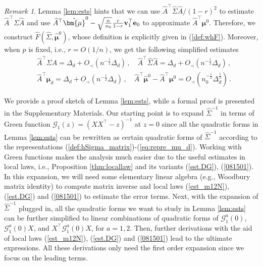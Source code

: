 \documentclass[12pt]{article}
\numberwithin{equation}{section}
\theoremstyle{remark}
\newtheorem{myRem}{Remark}
\newcommand{\1}{{\rm 1}\kern-0.24em{\rm I}}
\begin{document}
\begin{myRem} \label{rmk:ests}
Lemma \ref{lem:ests} hints that we can use $\widehat{A} ^{\top} \widehat\Sigma \widehat{A} /(1-r)^2$ to estimate $\widehat{A} ^{\top}  \Sigma \widehat{A} $ and use $\widehat{A} ^{\top} \hat{\bm{\mu}}^0 - \sqrt{\frac{n}{n_0}} \frac{r}{1-r} {\bf v}_1^{\top} {\bf e}_0$ to approximate $\widehat{A} ^{\top} {\bm{\mu}}^0$. Therefore,  we construct $\widehat{F}(\widehat\Sigma, \hat{\bm{\mu}}^0)$, whose definition is explicitly given in (\ref{def:whF}). Moreover, when $p$ is fixed, i.e., $r=O(1/n)$, we get the following simplified estimates
\begin{align}
&\widehat{A} ^{\top} \Sigma \widehat{A} = \varDelta_d+  O_\prec(n^{-\frac 12}\varDelta_d)\, ,\quad \widehat{A} ^{\top} \widehat\Sigma \widehat{A} =   \varDelta_d  + O_\prec(n^{-\frac 12}\varDelta_d)\, , \label{est:hAhShA_s}\\
&\widehat{A}^{\top}  {\bm{\mu}}_d  =   \varDelta_d + O_\prec(n^{-\frac 12} \varDelta_d)\,  ,
\quad \widehat{A} ^{\top} \hat{\bm{\mu}}^0 - \widehat{A} ^{\top}  {\bm{\mu}}^0 = O_\prec ( n_0^{-\frac 12} \varDelta_d^{\frac 12}) \,. \label{est:hAhmu0_s}
\end{align}
\end{myRem}



We provide a proof sketch  of Lemma \ref{lem:ests}, while a formal proof is presented in the Supplementary Materials.  Our starting point is to expand  $\widehat{\Sigma}^{-1}$ in terms of Green function $\mathcal{G}_1(z)= (XX^\top -z)^{-1}$ at $z=0$ since all the quadratic forms in Lemma \ref{lem:ests} can be rewritten as certain quadratic forms of $\widehat{\Sigma}^{-1}$ according to the representations (\ref{def:hSigma_matrix})-(\ref{eq:repre_mu_d}). Working with Green functions makes the analysis much easier due to the useful estimates in local laws, i.e.,  Proposition \ref{thm:locallaw} and its variants (\ref{est.DG}), (\ref{081501}).  In this expansion, we will need some elementary linear algebra (e.g., Woodbury matrix identity) to compute matrix inverse and local laws (\ref{est_m12N}), (\ref{est.DG}) and (\ref{081501}) to estimate the error terms. Next, with the expansion of $\widehat{\Sigma}^{-1}$ plugged in, all the quadratic forms we want to study in Lemma \ref{lem:ests} can be further simplified  to linear combinations of  quadratic forms of $\mathcal{G}_1^a(0)$, $\mathcal{G}_1^a(0)X$, and $X^\top \mathcal{G}_1^a(0) X$, for $a=1,2$. Then, further derivations with the aid of  local laws (\ref{est_m12N}), (\ref{est.DG}) and (\ref{081501}) lead to the ultimate expressions. All these derivations only need the first order expansion since we focus on the leading terms. 
\end{document}
